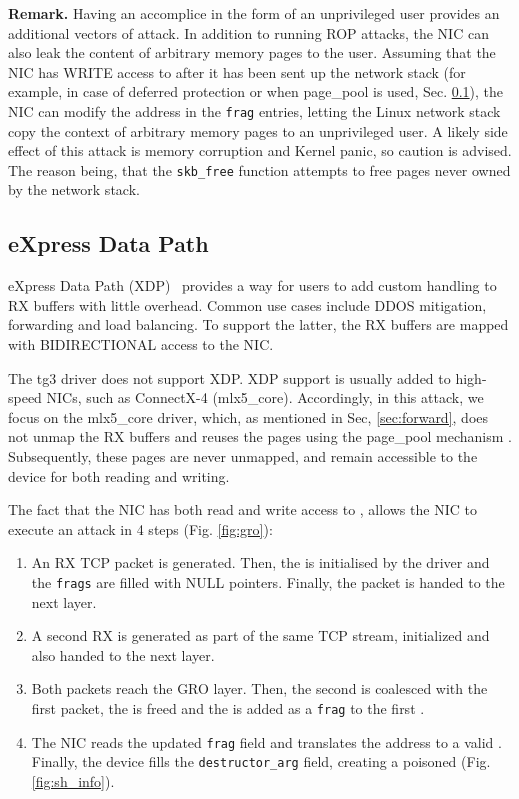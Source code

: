 \smallskip
\noindent\textbf{Remark.} Having an accomplice in the form of an unprivileged user provides an additional vectors of attack. In addition to running ROP attacks, the NIC can also leak the content of arbitrary memory pages to the user. Assuming that the NIC has WRITE access to \shinfo{} after it has been sent up the network stack (for example, in case of deferred protection or when page\_pool is used, Sec. \ref{sec:xdp}), the NIC can modify the \page{} address in the \texttt{frag} entries, letting the Linux network stack copy the context of arbitrary memory pages to an unprivileged user. A likely side effect of this attack is memory corruption and Kernel panic, so caution is advised. The reason being, that the \texttt{skb\_free} function attempts to free pages never owned by the network stack.

\subsection{eXpress Data Path}\label{sec:xdp}

eXpress Data Path (XDP)~\cite{xdp} provides a way for users to add custom handling to RX buffers with little overhead. Common use cases include DDOS mitigation, forwarding and load balancing. To support the latter, the RX buffers are mapped with BIDIRECTIONAL access to the NIC. 

The tg3 driver does not support XDP. XDP support is usually added to high-speed NICs, such as ConnectX-4 (mlx5\_core). Accordingly, in this attack, we focus on the mlx5\_core driver, which, as mentioned in Sec, \ref{sec:forward}, does not unmap the RX buffers and reuses the pages using the page\_pool mechanism \cite{page_pool}. Subsequently, these pages are never unmapped, and remain accessible to the device for both reading and writing. 

The fact that the NIC has both read and write access to \shinfo, allows the NIC to execute an attack in 4 steps (Fig. \ref{fig:gro}):
\begin{enumerate}
    \item An RX TCP packet is generated. Then, the \shinfo{} is initialised by the driver and the \texttt{frags} are filled with NULL pointers. Finally, the packet is handed to the next layer.
    
    \item A second RX \skb{} is generated as part of the same TCP stream, initialized and also handed to the next layer.
    
    \item Both packets reach the GRO layer. Then, the second \skb{} is coalesced with the first packet, the \skb{} is freed and the \data{} is added as a \texttt{frag} to the first \skb.
    
    \item The NIC reads the updated \texttt{frag} field and translates the \page{} address to a valid \kva{}. Finally, the device fills the \texttt{destructor\_arg} field, creating a poisoned \skb{} (Fig. \ref{fig:sh_info}).
\end{enumerate}

